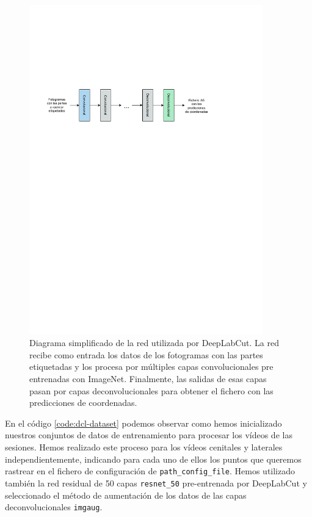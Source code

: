 \begin{figure}[h]
  \centering
  \includegraphics[width=0.9\textwidth]{figures/diagram-dlc.pdf}
  \caption[Diagrama simplificado de la red utilizada por DeepLabCut.]{Diagrama simplificado de la red utilizada por DeepLabCut. La red recibe como entrada los datos de los fotogramas con las partes etiquetadas y los procesa por múltiples capas convolucionales pre entrenadas con ImageNet. Finalmente, las salidas de esas capas pasan por capas deconvolucionales para obtener el fichero con las predicciones de coordenadas.}
  \label{fig:diagram-dlc}
\end{figure}

En el código \ref{code:dcl-dataset} podemos observar como hemos inicializado nuestros conjuntos de datos de entrenamiento para procesar los vídeos de las sesiones. Hemos realizado este proceso para los vídeos cenitales y laterales independientemente, indicando para cada uno de ellos los puntos que queremos rastrear en el fichero de configuración de \texttt{path\_config\_file}. Hemos utilizado también la red residual de 50 capas \texttt{resnet\_50} pre-entrenada por DeepLabCut y seleccionado el método de aumentación de los datos de las capas deconvolucionales \texttt{imgaug}.

